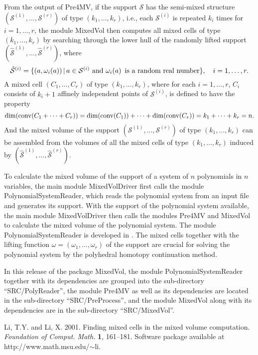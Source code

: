 \documentclass[acmtocl]{acmtrans2m}
\newcommand{\calA}{{\mathcal S}}
\newcommand{\conv}{{\rm conv}}
\begin{document}
From the output of Pre4MV, if the support $\calA$ has
the semi-mixed structure $(\calA^{(1)},\dots,\calA^{(r)})$ of type $(k_1,\dots,k_r)$,
i.e., each $\calA^{(i)}$ is repeated $k_i$ times for $i=1,\dots,r$,
the module MixedVol then computes all mixed cells of type $(k_1,\dots,k_r)$
by searching through the lower hull of the randomly lifted support
$(\hat{\calA}^{(1)},\dots,\hat{\calA}^{(r)})$, where
$$
\hat{\calA}^{(i)}=\{(a,\omega_i(a)) \,|\, a\in\calA^{(i)} \mbox{ \rm and } \omega_i(a) \,
\mbox{ \rm is a random real number}\},
\quad i=1,\dots, r.
$$
A mixed cell $(C_1,\dots,C_r)$ of type $(k_1,\dots,k_r)$, where for each
$i=1,\dots,r$, $C_i$ consists of $k_i+1$ affinely independent points of $\calA^{(i)}$,
is defined to have the property
$$
\dim(\conv(C_1+\cdots+C_r))=\dim(\conv(C_1))+\cdots+\dim(\conv(C_r))=k_1+\cdots+k_r=n.
$$
And the mixed volume of the support $(\calA^{(1)},\dots,\calA^{(r)})$ of type $(k_1,\dots,k_r)$
can be assembled from the volumes of all the mixed cells of type
$(k_1,\dots,k_r)$ induced by
$(\hat{\calA}^{(1)},\dots,\hat{\calA}^{(r)})$.

To calculate the mixed volume of the support of a system of $n$ polynomials
in $n$ variables, the main module MixedVolDriver first
calls the module PolynomialSystemReader, which
reads the polynomial system from an input file
and generates its support.
With the support of the polynomial system available,
the main module  MixedVolDriver then
calls the modules Pre4MV and MixedVol
to calculate the mixed volume of the polynomial system.
The module PolynomialSystemReader is developed in \cite{LiLi}.
The mixed cells together with the lifting function
$\omega=(\omega_1,\dots,\omega_r)$ of the support are crucial
for solving the polynomial system
by the polyhedral homotopy continuation method.

In this release of the package MixedVol, the module PolynomialSystemReader
together with its dependencies are grouped into the sub-directory ``SRC/PolyReader'',
the module Pre4MV as well as its dependencies are located in the sub-directory
``SRC/PreProcess'',
and the module MixedVol along with its dependencies are in the sub-directory ``SRC/MixedVol''.



\begin{thebibliography}{}


Li, T.Y. and Li, X. 2001.
Finding mixed cells in the mixed volume computation.
{\it Foundation of Comput. Math.} {\bf 1}, 161--181.
Software package available at
http://www.math.msu.edu/$\sim$li.


\end{thebibliography}
\end{document}
